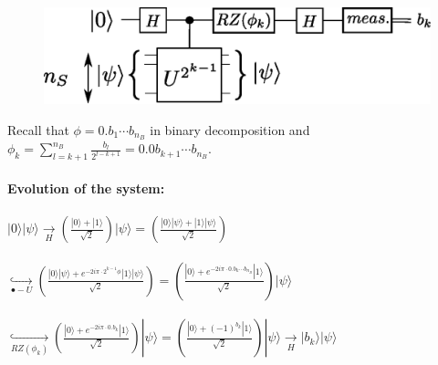 \documentclass{beamer}
\begin{document}
\begin{frame}
\begin{center}
\begin{figure}
\includegraphics[width=.6\textwidth]{iterative_pea.eps}
\end{figure}
\end{center}
Recall that $\phi=0.b_{1}\cdots b_{n_{B}}$ in binary decomposition 
and $\phi_{k}=\sum_{l=k+1}^{n_{B}} \frac{b_{l}}{2^{l-k+1}}=0.0b_{k+1}\cdots b_{n_{B}}$.\\~\\
\textbf{Evolution of the system:}\\~\\
$|0\rangle|\psi\rangle \underset{H}{\rightarrow} \left(\frac{|0\rangle+|1\rangle}{\sqrt{2}}\right)|\psi\rangle=
\left(\frac{|0\rangle|\psi\rangle+|1\rangle|\psi\rangle}{\sqrt{2}}\right)$\\~\\
$\underset{\bullet-U}{\hookrightarrow}\left(\frac{|0\rangle|\psi\rangle+e^{-2i\pi\cdot 2^{k-1}\phi}|1\rangle|\psi\rangle}{\sqrt{2}}\right)
=\left(\frac{|0\rangle+e^{-2i\pi\cdot 0.b_{k}\cdots b_{n_{B}}}|1\rangle}{\sqrt{2}}\right)|\psi\rangle$\\~\\
$\underset{RZ(\phi_{k})}{\hookrightarrow} \left(\frac{|0\rangle+e^{-2i\pi\cdot 0.b_{k}}|1\rangle}{\sqrt{2}}\right)|\psi\rangle
=\left(\frac{|0\rangle+(-1)^{b_{k}}|1\rangle}{\sqrt{2}}\right)|\psi\rangle
\underset{H}{\rightarrow}|b_{k}\rangle|\psi\rangle$
\end{frame}
\end{document}
